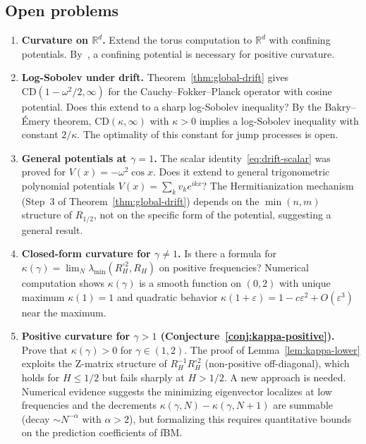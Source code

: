 \documentclass[11pt,a4paper]{article}
\theoremstyle{plain}
\theoremstyle{definition}
\theoremstyle{remark}
\newcommand{\R}{\mathbb{R}}
\begin{document}
\subsection{Open problems}

\begin{enumerate}[label=(\roman*)]
\item \textbf{Curvature on $\R^d$.}
  Extend the torus computation to $\R^d$ with confining potentials.
  By~\cite{SpenerWeberZacher2020}, a confining potential is necessary
  for positive curvature.

\item \textbf{Log-Sobolev under drift.}
  Theorem~\ref{thm:global-drift} gives $\mathrm{CD}(1-\omega^2/2,\infty)$
  for the Cauchy--Fokker--Planck operator with cosine potential.
  Does this extend to a sharp log-Sobolev inequality?
  By the Bakry--\'Emery theorem, $\mathrm{CD}(\kappa,\infty)$ with
  $\kappa > 0$ implies a log-Sobolev inequality with constant $2/\kappa$.
  The optimality of this constant for jump processes is open.

\item \textbf{General potentials at $\gamma = 1$.}
  The scalar identity~\eqref{eq:drift-scalar} was proved for
  $V(x) = -\omega^2\cos x$.  Does it extend to general trigonometric
  polynomial potentials $V(x) = \sum_k v_k e^{ikx}$?
  The Hermitianization mechanism (Step~3 of Theorem~\ref{thm:global-drift})
  depends on the $\min(n,m)$ structure of $R_{1/2}$, not on the
  specific form of the potential, suggesting a general result.

\item \textbf{Closed-form curvature for $\gamma \neq 1$.}
  Is there a formula for
  $\kappa(\gamma) = \lim_N \lambda_{\min}(R_H^{\circ 2}, R_H)$
  on positive frequencies? Numerical computation shows
  $\kappa(\gamma)$ is a smooth function on $(0,2)$ with
  unique maximum $\kappa(1) = 1$ and quadratic behavior
  $\kappa(1+\varepsilon) = 1 - c\varepsilon^2 + O(\varepsilon^3)$
  near the maximum.

\item \textbf{Positive curvature for $\gamma > 1$
  (Conjecture~\ref{conj:kappa-positive}).}
  Prove that $\kappa(\gamma) > 0$ for $\gamma \in (1,2)$.
  The proof of Lemma~\ref{lem:kappa-lower} exploits the Z-matrix
  structure of $R_H^{-1}R_H^{\circ 2}$ (non-positive off-diagonal),
  which holds for $H \leq 1/2$ but fails sharply at $H > 1/2$.
  A new approach is needed.  Numerical evidence
  suggests the minimizing eigenvector localizes at low frequencies
  and the decrements $\kappa(\gamma,N) - \kappa(\gamma,N{+}1)$
  are summable (decay $\sim N^{-\alpha}$ with $\alpha > 2$),
  but formalizing this requires quantitative bounds on the
  prediction coefficients of fBM.


\end{enumerate}
\end{document}
